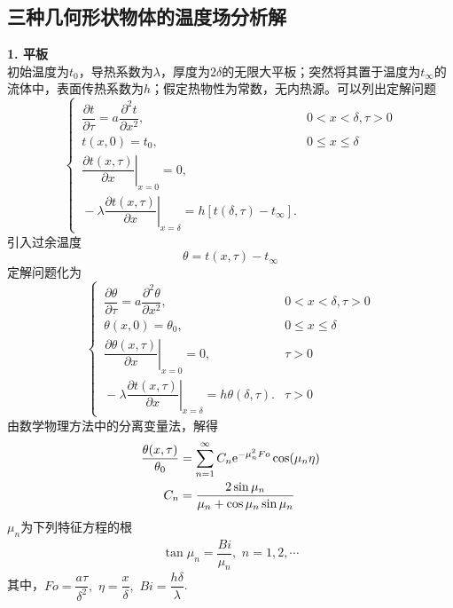 \subsection{三种几何形状物体的温度场分析解}
\noindent \textbf{1. 平板}\\
\hspace*{2em} 初始温度为$t_0$，导热系数为$\lambda$，厚度为$2\delta$的无限大平板；突然将其置于温度为$t_\infty$的流体中，表面传热系数为$h$；假定热物性为常数，无内热源。可以列出定解问题
\begin{equation}
	\begin{cases}
		\, \dfrac{\partial t}{\partial \tau} = a \dfrac{\partial^2 t}{\partial x^2}, &0 < x < \delta , \tau > 0\\[0.5em]
		\, t(x,0) = t_0, & 0 \le x \le \delta\\[0.5em]
		\, \left. \dfrac{\partial t(x, \tau)}{\partial x} \right|_{x = 0} = 0,\\[0.7em]
		\, -\lambda \left. \dfrac{\partial t(x, \tau)}{\partial x} \right|_{x = \delta} = h\left[t(\delta, \tau) - t_\infty \right].
	\end{cases}
\end{equation}
引入过余温度
\begin{equation}
	\theta = t(x, \tau) - t_\infty
\end{equation}
定解问题化为
\begin{equation}
	\begin{cases}
		\, \dfrac{\partial \theta}{\partial \tau} = a \dfrac{\partial^2 \theta}{\partial x^2}, &0 < x < \delta , \tau > 0\\[0.5em]
		\, \theta(x,0) = \theta_0, & 0 \le x \le \delta\\[0.5em]
		\, \left. \dfrac{\partial \theta(x, \tau)}{\partial x} \right|_{x = 0} = 0, & \tau > 0\\[1em]
		\, -\lambda \left. \dfrac{\partial t(x, \tau)}{\partial x} \right|_{x = \delta} = h\theta(\delta, \tau). & \tau > 0
	\end{cases}
\end{equation}
由数学物理方法中的分离变量法，解得
\begin{align}
	\dfrac{\theta(x,\tau)}{\theta_0} &= \sum_{n = 1}^{\infty} C_n {\rm{e}}^{- \mu_n^2 Fo} \cos(\mu_n\eta)\\
	C_n &= \dfrac{2 \sin \mu_n}{\mu_n + \cos \mu_n \sin \mu_n}
\end{align}
$\mu_n$为下列特征方程的根
\begin{align}
	\tan \mu_n = \dfrac{Bi}{\mu_n}, \,\, n = 1,2,\cdots
\end{align}
其中，$Fo = \dfrac{a \tau}{\delta^2},\,\, \eta = \dfrac{x}{\delta}, \,\, Bi = \dfrac{h \delta}{\lambda}$.
\vspace*{1em}

